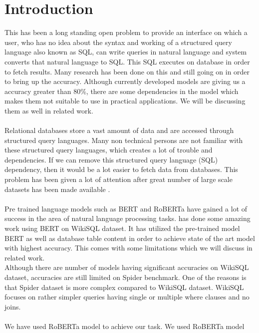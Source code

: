 \documentclass[12pt]{article}
\begin{document}
 

\section{Introduction}
 
This has been a long standing open problem to provide an interface on which a user, who has no idea about the syntax and working of a structured query language also known as SQL, can write queries in natural language and system converts that natural language to SQL. This SQL executes on database in order to fetch results. Many research has been done on this and still going on in order to bring up the accuracy. Although currently developed models are giving us a accuracy greater than 80\%, there are some dependencies in the model which makes them not suitable to use in practical applications. We will be discussing them as well in related work.
\\ \\
 Relational databases store a vast amount of data and are accessed through structured query languages. Many non technical persons are not familiar with these structured query languages, which creates a lot of trouble and dependencies. If we can remove this structured query language (SQL) dependency, then it would be a lot easier to fetch data from databases. This problem has been given a lot of attention after great number of  large scale datasets has been made available \cite{zhong2017seq2sql} \cite{setlur2019inferencing} \cite{yu2018spider}. 
\\ \\
Pre trained language models such as BERT \cite{devlin2018bert} and RoBERTa \cite{liu2019roberta}  have gained a lot of success in the area of natural language processing tasks. \cite{guo2019content} has done some amazing work using BERT on WikiSQL dataset. It has utilized the pre-trained model BERT as well as database table content in order to achieve state of the art model with highest accuracy. This comes with some limitations which we will discuss in related work. 
\\Although there are number of models having significant accuracies on WikiSQL dataset, accuracies are still limited on Spider benchmark\cite{yu2018spider}. One of the reasons is that Spider dataset is more complex compared to WikiSQL dataset. WikiSQL focuses on rather simpler queries having single or multiple where clauses and no joins.\\
\\
We have used RoBERTa model to achieve our task. We used RoBERTa model
\end{document}
